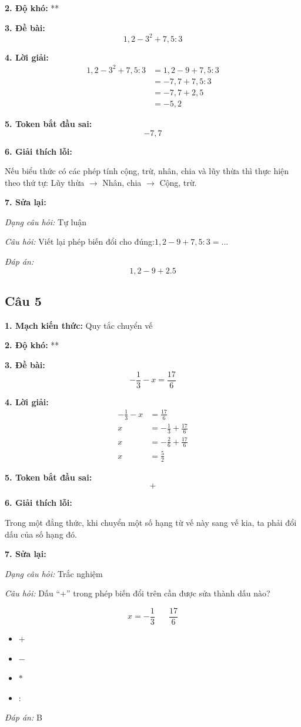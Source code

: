 \noindent\textbf{2. Độ khó:} **

\noindent\textbf{3. Đề bài:}
\[
1,2 - 3^2 + 7,5 : 3
\]

\noindent\textbf{4. Lời giải:}
\begin{align*}
1,2 - 3^2 + 7,5 : 3
    &= 1,2 - 9 + 7,5 : 3 \\
    &= -7,7 + 7,5 : 3 \\
    &= -7,7 + 2,5 \\
    &= -5,2
\end{align*}

\noindent\textbf{5. Token bắt đầu sai:}
\[
-7,7
\]

\noindent\textbf{6. Giải thích lỗi:}

Nếu biểu thức có các phép tính cộng, trừ, nhân, chia và lũy thừa thì thực hiện theo thứ tự: Lũy thừa $\rightarrow$ Nhân, chia $\rightarrow$ Cộng, trừ.

\noindent\textbf{7. Sửa lại:}

\textit{Dạng câu hỏi:} Tự luận

\textit{Câu hỏi:} Viết lại phép biến đổi cho đúng:$1,2 - 9 + 7,5 : 3=...$ 

\textit{Đáp án:}
\[
1,2 - 9 + 2.5
\]

\subsection*{Câu 5}

\noindent\textbf{1. Mạch kiến thức:} Quy tắc chuyển vế

\noindent\textbf{2. Độ khó:} **

\noindent\textbf{3. Đề bài:}
\[
-\frac{1}{3}-x=\frac{17}{6}
\]

\noindent\textbf{4. Lời giải:}
\begin{align*}
-\frac{1}{3}-x
    &= \frac{17}{6} \\
x
    &= -\frac{1}{3}+\frac{17}{6} \\
x
    &= -\frac{2}{6}+\frac{17}{6}
    \\
x
    &= \frac{5}{2}
\end{align*}

\noindent\textbf{5. Token bắt đầu sai:}
\[
+
\]

\noindent\textbf{6. Giải thích lỗi:}

Trong một đẳng thức, khi chuyển một số hạng từ vế này sang vế kia, ta phải đổi dấu của số hạng đó.

\noindent\textbf{7. Sửa lại:}

\textit{Dạng câu hỏi:} Trắc nghiệm

\textit{Câu hỏi:} Dấu ``$+$'' trong phép biến đổi trên cần được sửa thành dấu nào?

\[
x=-\frac{1}{3}\ \boxed{\phantom{+}}\ \frac{17}{6}
\]

\begin{itemize}
    \item[A.] $+$
    \item[B.] $-$
    \item[C.] $*$
    \item[D.] $:$
\end{itemize}

\textit{Đáp án:} B